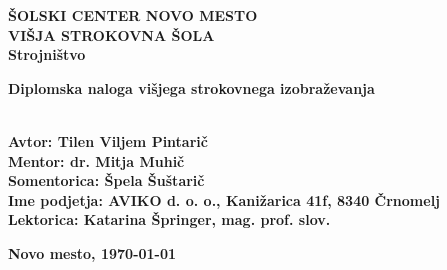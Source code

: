 \begin{titlepage}
	\begin{center}
		\textbf{\fontsize{20}{36}\selectfont
			ŠOLSKI CENTER NOVO MESTO\\
			VIŠJA STROKOVNA ŠOLA\\
			Strojništvo\\
		}

		\vspace*{3.2cm}
		\textbf{\fontsize{18}{32}\selectfont
			Diplomska naloga višjega strokovnega izobraževanja\\
			\vspace*{1cm}
			\fontsize{26}{39}\selectfont \MakeUppercase{\thetitle}\\
		}

	\end{center}

	\vfill

	\textbf{\fontsize{14}{21}\selectfont
		Avtor: Tilen Viljem Pintarič \\
		Mentor: dr. Mitja Muhič \\
		Somentorica: Špela Šuštarič \\
		Ime podjetja: AVIKO d. o. o., Kanižarica 41f, 8340 Črnomelj \\
		Lektorica: Katarina Špringer, mag. prof. slov.
	}

	\textbf{\fontsize{14}{21}\selectfont
		\hfill
		Novo mesto,
		\monthyeardate\today
	}
\end{titlepage}